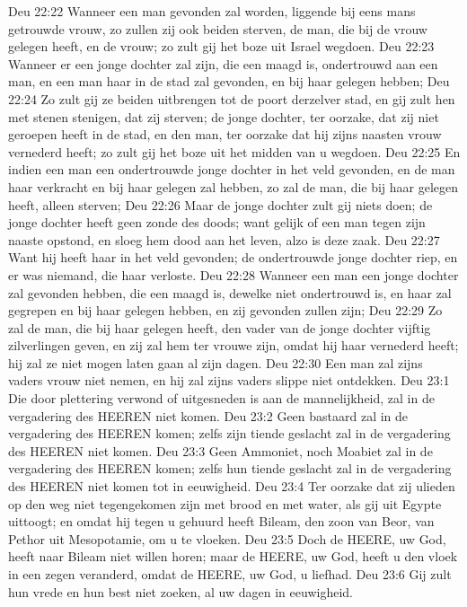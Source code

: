 Deu 22:22  Wanneer een man gevonden zal worden, liggende bij eens mans getrouwde vrouw, zo zullen zij ook beiden sterven, de man, die bij de vrouw gelegen heeft, en de vrouw; zo zult gij het boze uit Israel wegdoen.
Deu 22:23  Wanneer er een jonge dochter zal zijn, die een maagd is, ondertrouwd aan een man, en een man haar in de stad zal gevonden, en bij haar gelegen hebben;
Deu 22:24  Zo zult gij ze beiden uitbrengen tot de poort derzelver stad, en gij zult hen met stenen stenigen, dat zij sterven; de jonge dochter, ter oorzake, dat zij niet geroepen heeft in de stad, en den man, ter oorzake dat hij zijns naasten vrouw vernederd heeft; zo zult gij het boze uit het midden van u wegdoen.
Deu 22:25  En indien een man een ondertrouwde jonge dochter in het veld gevonden, en de man haar verkracht en bij haar gelegen zal hebben, zo zal de man, die bij haar gelegen heeft, alleen sterven;
Deu 22:26  Maar de jonge dochter zult gij niets doen; de jonge dochter heeft geen zonde des doods; want gelijk of een man tegen zijn naaste opstond, en sloeg hem dood aan het leven, alzo is deze zaak.
Deu 22:27  Want hij heeft haar in het veld gevonden; de ondertrouwde jonge dochter riep, en er was niemand, die haar verloste.
Deu 22:28  Wanneer een man een jonge dochter zal gevonden hebben, die een maagd is, dewelke niet ondertrouwd is, en haar zal gegrepen en bij haar gelegen hebben, en zij gevonden zullen zijn;
Deu 22:29  Zo zal de man, die bij haar gelegen heeft, den vader van de jonge dochter vijftig zilverlingen geven, en zij zal hem ter vrouwe zijn, omdat hij haar vernederd heeft; hij zal ze niet mogen laten gaan al zijn dagen.
Deu 22:30  Een man zal zijns vaders vrouw niet nemen, en hij zal zijns vaders slippe niet ontdekken.
Deu 23:1  Die door plettering verwond of uitgesneden is aan de mannelijkheid, zal in de vergadering des HEEREN niet komen.
Deu 23:2  Geen bastaard zal in de vergadering des HEEREN komen; zelfs zijn tiende geslacht zal in de vergadering des HEEREN niet komen.
Deu 23:3  Geen Ammoniet, noch Moabiet zal in de vergadering des HEEREN komen; zelfs hun tiende geslacht zal in de vergadering des HEEREN niet komen tot in eeuwigheid.
Deu 23:4  Ter oorzake dat zij ulieden op den weg niet tegengekomen zijn met brood en met water, als gij uit Egypte uittoogt; en omdat hij tegen u gehuurd heeft Bileam, den zoon van Beor, van Pethor uit Mesopotamie, om u te vloeken.
Deu 23:5  Doch de HEERE, uw God, heeft naar Bileam niet willen horen; maar de HEERE, uw God, heeft u den vloek in een zegen veranderd, omdat de HEERE, uw God, u liefhad.
Deu 23:6  Gij zult hun vrede en hun best niet zoeken, al uw dagen in eeuwigheid.
